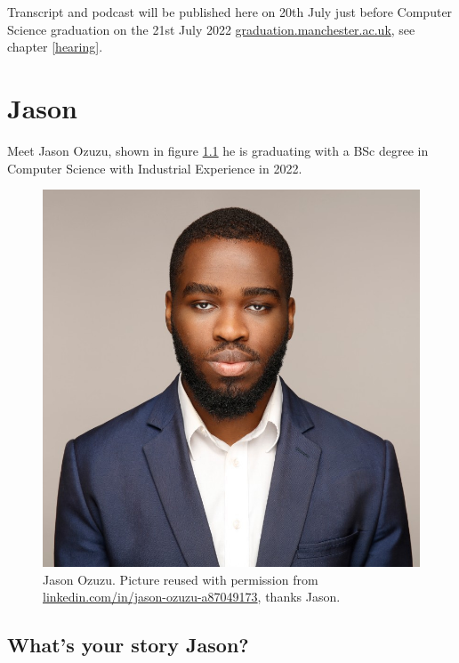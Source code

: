 \documentclass[
]{book}
\begin{document}
Transcript and podcast will be published here on 20th July just before Computer Science graduation on the 21st July 2022 \href{http://www.graduation.manchester.ac.uk/}{graduation.manchester.ac.uk}, see chapter \ref{hearing}.

\hypertarget{jason}{%
\chapter{Jason}\label{jason}}

Meet Jason Ozuzu, shown in figure \ref{fig:jason-fig} he is graduating with a BSc degree in Computer Science with Industrial Experience in 2022.

\begin{figure}

{\centering \includegraphics[width=1\linewidth]{images/jason} 

}

\caption{Jason Ozuzu. Picture reused with permission from \href{https://www.linkedin.com/in/jason-ozuzu-a87049173/}{linkedin.com/in/jason-ozuzu-a87049173}, thanks Jason.}\label{fig:jason-fig}
\end{figure}



\hypertarget{jason-story}{%
\section{What's your story Jason?}\label{jason-story}}
\end{document}
